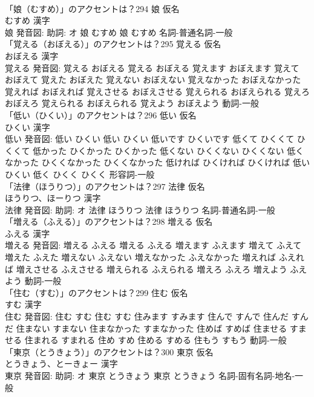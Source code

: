 \documentclass[8pt]{extreport}
\begin{document}
\begin{CJK}{UTF8}{min}
\\	「娘（むすめ）」のアクセントは？294	娘 仮名　
\\	むすめ 漢字　
\\	娘 発音図: 助詞: オ	娘 むすめ		娘 むすめ				名詞-普通名詞-一般 
\\	「覚える（おぼえる）」のアクセントは？295	覚える 仮名　
\\	おぼえる 漢字　
\\	覚える 発音図:	覚える おぼえる		覚える おぼえる 覚えます おぼえます 覚えて おぼえて 覚えた おぼえた 覚えない おぼえない 覚えなかった おぼえなかった 覚えれば おぼえれば 覚えさせる おぼえさせる 覚えられる おぼえられる 覚えろ おぼえろ 覚えられる おぼえられる 覚えよう おぼえよう				動詞-一般 
\\	「低い（ひくい）」のアクセントは？296	低い 仮名　
\\	ひくい 漢字　
\\	低い 発音図:	低い ひくい		低い ひくい 低いです ひくいです 低くて ひくくて ひくくて 低かった ひくかった ひくかった 低くない ひくくない ひくくない 低くなかった ひくくなかった ひくくなかった 低ければ ひくければ ひくければ 低い ひくい 低く ひくく ひくく				形容詞-一般 
\\	「法律（ほうりつ）」のアクセントは？297	法律 仮名　
\\	ほうりつ、ほーりつ 漢字　
\\	法律 発音図: 助詞: オ	法律 ほうりつ		法律 ほうりつ				名詞-普通名詞-一般 
\\	「増える（ふえる）」のアクセントは？298	増える 仮名　
\\	ふえる 漢字　
\\	増える 発音図:	増える ふえる		増える ふえる 増えます ふえます 増えて ふえて 増えた ふえた 増えない ふえない 増えなかった ふえなかった 増えれば ふえれば 増えさせる ふえさせる 増えられる ふえられる 増えろ ふえろ 増えよう ふえよう				動詞-一般 
\\	「住む（すむ）」のアクセントは？299	住む 仮名　
\\	すむ 漢字　
\\	住む 発音図:	住む すむ		住む すむ 住みます すみます 住んで すんで 住んだ すんだ 住まない すまない 住まなかった すまなかった 住めば すめば 住ませる すませる 住まれる すまれる 住め すめ 住める すめる 住もう すもう				動詞-一般 
\\	「東京（とうきょう）」のアクセントは？300	東京 仮名　
\\	とうきょう、とーきょー 漢字　
\\	東京 発音図: 助詞: オ	東京 とうきょう		東京 とうきょう				名詞-固有名詞-地名-一般 

\end{CJK}
\end{document}
